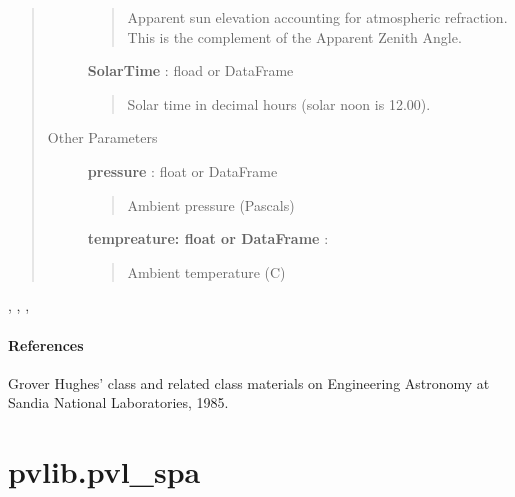 \documentclass[letterpaper,10pt,english]{sphinxmanual}
\begin{document}
\begin{fulllineitems}
\begin{quote}
\begin{description}
\begin{quote}
Apparent sun elevation accounting for atmospheric 
refraction. This is the complement of the Apparent Zenith Angle.
\end{quote}

\textbf{SolarTime} : fload or DataFrame
\begin{quote}

Solar time in decimal hours (solar noon is 12.00).
\end{quote}

\item[{Other Parameters}] \leavevmode
\textbf{pressure} : float or DataFrame
\begin{quote}

Ambient pressure (Pascals)
\end{quote}

\textbf{tempreature: float or DataFrame} :
\begin{quote}

Ambient temperature (C)
\end{quote}

\end{description}\end{quote}




{\hyperref[stubs/pvlib.pvl_makelocationstruct:pvlib.pvl_makelocationstruct]{}}, {\hyperref[stubs/pvlib.pvl_alt2pres:pvlib.pvl_alt2pres]{}}, {\hyperref[stubs/pvlib.pvl_getaoi:pvlib.pvl_getaoi]{}}, {\hyperref[stubs/pvlib.pvl_spa:pvlib.pvl_spa]{}}


\paragraph{References}

Grover Hughes' class and related class materials on Engineering 
Astronomy at Sandia National Laboratories, 1985.

\end{fulllineitems}



\section{pvlib.pvl\_spa}
\label{stubs/pvlib.pvl_spa::doc}\label{stubs/pvlib.pvl_spa:pvlib-pvl-spa}
\end{document}
